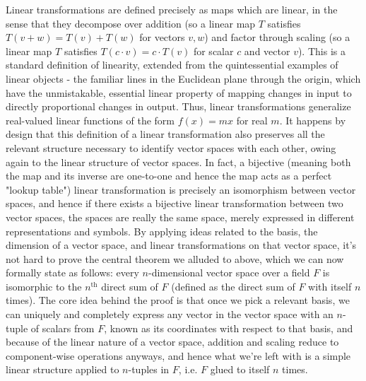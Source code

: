 \documentclass{article}
\newcommand{\nn}{\leavevmode \newline \newline}
\begin{document}
Linear transformations are defined precisely as maps which are linear, in the sense that they decompose over addition (so a linear map $ T $ satisfies $ T(v + w) = T(v) + T(w) $ for vectors $ v, w $) and factor through scaling (so a linear map $ T $ satisfies $ T(c \cdot v) = c \cdot T(v) $ for scalar $ c $ and vector $ v $). This is a standard definition of linearity, extended from the quintessential examples of linear objects - the familiar lines in the Euclidean plane through the origin, which have the unmistakable, essential linear property of mapping changes in input to directly proportional changes in output. Thus, linear transformations generalize real-valued linear functions of the form $ f(x) = m x $ for real $ m $. It happens by design that this definition of a linear transformation also preserves all the relevant structure necessary to identify vector spaces with each other, owing again to the linear structure of vector spaces. In fact, a bijective (meaning both the map and its inverse are one-to-one and hence the map acts as a perfect "lookup table") linear transformation is precisely an isomorphism between vector spaces, and hence if there exists a bijective linear transformation between two vector spaces, the spaces are really the same space, merely expressed in different representations and symbols. By applying ideas related to the basis, the dimension of a vector space, and linear transformations on that vector space, it's not hard to prove the central theorem we alluded to above, which we can now formally state as follows: every $ n $-dimensional vector space over a field $ F $ is isomorphic to the $ n^\text{th} $ direct sum of $ F $ (defined as the direct sum of $ F $ with itself $ n $ times). The core idea behind the proof is that once we pick a relevant basis, we can uniquely and completely express any vector in the vector space with an $ n $-tuple of scalars from $ F $, known as its coordinates with respect to that basis, and because of the linear nature of a vector space, addition and scaling reduce to component-wise operations anyways, and hence what we're left with is a simple linear structure applied to $ n $-tuples in $ F $, i.e. $ F $ glued to itself $ n $ times.
\nn
\end{document}
